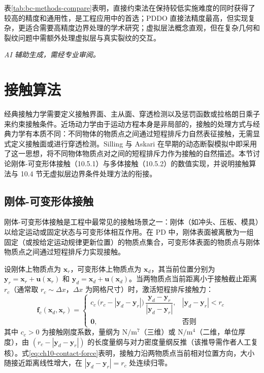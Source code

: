 表\ref{tab:bc-methods-compare}表明，直接约束法在保持较低实施难度的同时获得了较高的精度和通用性，是工程应用中的首选；PDDO 直接法精度最高，但实现复杂，更适合需要高精度边界处理的学术研究；虚拟层法概念直观，但在复杂几何和裂纹问题中需额外处理虚拟层与真实裂纹的交互。

\emph{AI 辅助生成，需经专业审阅。}


\section{接触算法}

经典接触力学需要定义接触界面、主从面、穿透检测以及惩罚函数或拉格朗日乘子来约束接触条件。近场动力学由于运动方程本身是非局部的，接触的处理方式与经典力学有本质不同：不同物体的物质点之间通过短程排斥力自然表征接触，无需显式定义接触面或进行穿透检测。Silling 与 Askari \cite{SillingAskari2005} 在早期的动态断裂模拟中即采用了这一思想，将不同物体物质点对之间的短程排斥力作为接触的自然描述。本节讨论刚体-可变形体接触（10.5.1）与多体接触（10.5.2）的数值实现，并说明接触算法与 10.4 节无虚拟层边界条件处理方法的衔接。

\subsection{刚体-可变形体接触}

刚体-可变形体接触是工程中最常见的接触场景之一：刚体（如冲头、压板、模具）以给定运动或固定状态与可变形体相互作用。在 PD 中，刚体表面被离散为一组固定（或按给定运动规律更新位置）的物质点集合，可变形体表面的物质点与刚体物质点之间通过短程排斥力实现接触。

设刚体上物质点为 $\mathbf{x}_{r}$，可变形体上物质点为 $\mathbf{x}_{d}$，其当前位置分别为 $\mathbf{y}_{r}=\mathbf{x}_{r}+\mathbf{u}(\mathbf{x}_{r})$ 和 $\mathbf{y}_{d}=\mathbf{x}_{d}+\mathbf{u}(\mathbf{x}_{d})$。当两物质点当前距离小于接触截止距离 $r_{c}$（通常取 $r_{c}\sim\Delta x$，$\Delta x$ 为网格尺寸）时，激活短程排斥接触力：
\begin{equation}
\mathbf{f}_{c}(\mathbf{x}_{d},\mathbf{x}_{r}) =
\begin{cases}
c_{c}\,\bigl(r_{c} - |\mathbf{y}_{d}-\mathbf{y}_{r}|\bigr)\,\dfrac{\mathbf{y}_{d}-\mathbf{y}_{r}}{|\mathbf{y}_{d}-\mathbf{y}_{r}|}, & |\mathbf{y}_{d}-\mathbf{y}_{r}| < r_{c}\\
\mathbf{0}, & \text{否则}
\end{cases}
\label{eq:ch10-contact-force}
\end{equation}
其中 $c_{c}>0$ 为接触刚度系数，量纲为 $\mathrm{N}/\mathrm{m}^{7}$（三维）或 $\mathrm{N}/\mathrm{m}^{4}$（二维，单位厚度），由 $(r_{c}-|\mathbf{y}_{d}-\mathbf{y}_{r}|)$ 的长度量纲与对力密度量纲反推（该推导需作者人工复核）。式\eqref{eq:ch10-contact-force}表明，接触力沿两物质点当前相对位置方向，大小随接近距离线性增大，在 $|\mathbf{y}_{d}-\mathbf{y}_{r}|=r_{c}$ 处连续归零。

